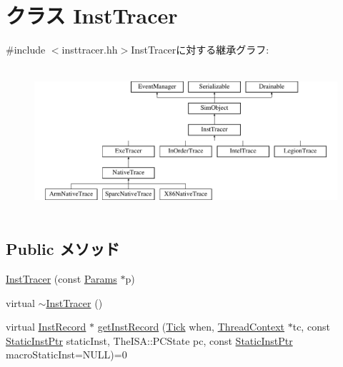 \hypertarget{classTrace_1_1InstTracer}{
\section{クラス InstTracer}
\label{classTrace_1_1InstTracer}
}


{\ttfamily \#include $<$insttracer.hh$>$}InstTracerに対する継承グラフ:\begin{figure}[H]
\begin{center}
\leavevmode
\includegraphics[height=5.46341cm]{classTrace_1_1InstTracer}
\end{center}
\end{figure}
\subsection*{Public メソッド}
\begin{DoxyCompactItemize}
\item 
\hyperlink{classTrace_1_1InstTracer_a7c3b316fe172f5cded790583ca25852c}{InstTracer} (const \hyperlink{classSimObject_a0f0761d2db586a23bb2a2880b8f387bb}{Params} $\ast$p)
\item 
virtual \hyperlink{classTrace_1_1InstTracer_a2cbf63eb075ece4bf1250efeced23231}{$\sim$InstTracer} ()
\item 
virtual \hyperlink{classTrace_1_1InstRecord}{InstRecord} $\ast$ \hyperlink{classTrace_1_1InstTracer_a4891aa2e596bcb475928d8fe1766a9df}{getInstRecord} (\hyperlink{base_2types_8hh_a5c8ed81b7d238c9083e1037ba6d61643}{Tick} when, \hyperlink{classThreadContext}{ThreadContext} $\ast$tc, const \hyperlink{classRefCountingPtr}{StaticInstPtr} staticInst, TheISA::PCState pc, const \hyperlink{classRefCountingPtr}{StaticInstPtr} macroStaticInst=NULL)=0
\end{DoxyCompactItemize}



